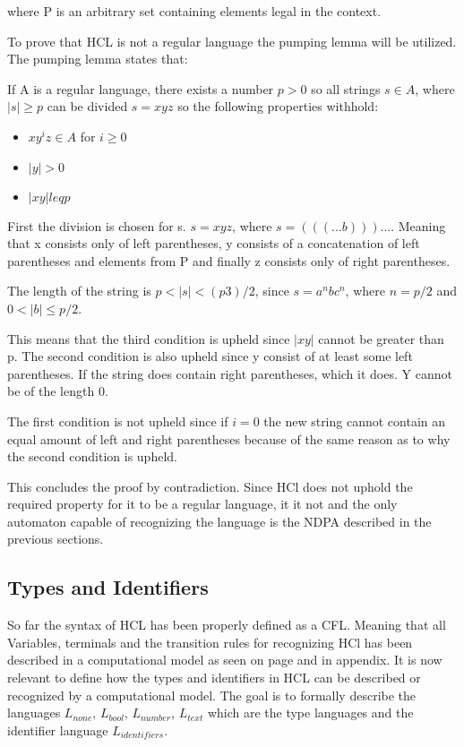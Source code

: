 where P is an arbitrary set containing elements legal in the context.

To prove that HCL is not a regular language the pumping lemma will be utilized.
The pumping lemma states that:
\begin{center}
	If A is a regular language, there exists a number $p>0$ so all strings $s \in A $, where $|s| \geq p$ can be divided $s = xyz$ so the following properties withhold:
	\begin{itemize}
		\item $xy^iz \in A$ for $i \geq 0$
		\item $|y| > 0$
		\item $|xy| leq p$
	\end{itemize}
\end{center}

First the division is chosen for s.
$s = xyz$, where $s = (((...b)))...$.
Meaning that x consists only of left parentheses, y consists of a concatenation of left parentheses and elements from P and finally z consists only of right parentheses.

The length of the string is $p < |s| < (p3)/2$, since $s = a^nbc^n$, where $n = p/2$ and $0 < |b| \leq p/2$.

This means that the third condition is upheld since $|xy|$ cannot be greater than p.
The second condition is also upheld since y consist of at least some left parentheses. If the string does contain right parentheses, which it does. Y cannot be of the length 0.

The first condition is not upheld since if $i = 0$ the new string cannot contain an equal amount of left and right parentheses because of the same reason as to why the second condition is upheld.

This concludes the proof by contradiction.
Since HCl does not uphold the required property for it to be a regular language, it it not and the only automaton capable of recognizing the language is the NDPA described in the previous sections.

\subsection{Types and Identifiers}
So far the syntax of HCL has been properly defined as a CFL. 
Meaning that all Variables, terminals and the transition rules for recognizing HCl has been described in a computational model as seen on page 
and in appendix.
It is now relevant to define how the types and identifiers in HCL can be described or recognized by a computational model.
The goal is to formally describe the languages $L_{none}$, $L_{bool}$, $L_{number}$, $L_{text}$ which are the type languages and the identifier language $L_{identifiers}$.

